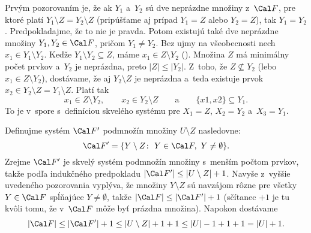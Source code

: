 {Prvým pozorovaním je, že ak $Y_1$ a~$Y_2$ sú dve neprázdne množiny z~$\Cal F$, pre ktoré platí $Y_1\setminus Z = Y_2\setminus Z$ (pripúšťame aj prípad
$Y_1 = Z$ alebo $Y_2 = Z$), tak $Y_1 = Y_2$. Predpokladajme, že to nie je pravda. Potom existujú také dve neprázdne množiny $Y_1,Y_2\in\Cal F$, pričom $Y_1\ne Y_2$. Bez ujmy na všeobecnosti nech $x_1\in Y_1\setminus Y_2$. Keďže $Y_1\setminus Y_2\subseteq Z$, máme $x_1\in Z\setminus Y_2$ (\obr). Množina $Z$ má minimálny počet prvkov a~$Y_2$ je neprázdna, preto $|Z|\le|Y_2|$. Z~toho, že $Z\not\subseteq Y_2$ (lebo $x_1\in Z\setminus Y_2$), dostávame, že aj $Y_2\setminus Z$ je neprázdna a~teda existuje prvok $x_2\in Y_2\setminus Z = Y_1\setminus Z$. Platí tak
$$
x_1 \in Z\setminus Y_2,\qquad x_2\in Y_2\setminus Z\qquad\text{a}\qquad \{x1,x2\}\subseteq Y_1.
$$
To je v~spore s~definíciou skvelého systému pre $X_1 = Z$, $X_2 = Y_2$ a~$X_3 = Y_1$.
%

Definujme systém $\Cal F'$ podmnožín množiny $U\setminus Z$ nasledovne:
$$
\Cal F' = \{Y\setminus Z\colon\ Y\in\Cal F,\ Y\ne\emptyset\}.
$$
Zrejme $\Cal F'$ je skvelý systém podmnožín množiny s~menším počtom prvkov, takže podľa indukčného predpokladu $|\Cal F'|\le|U\setminus Z|+1$. Navyše z~vyššie uvedeného pozorovania vyplýva, že množiny $Y\setminus Z$ sú navzájom rôzne pre všetky $Y\in\Cal F$ spĺňajúce $Y\ne\emptyset$, takže $|\Cal F|\le|\Cal F'|+1$ (sčítanec $+1$ je tu kvôli tomu, že v~$\Cal F$ môže byť prázdna množina). Napokon dostávame
$$
|\Cal F| \le |\Cal F'| + 1 \le |U\setminus Z| + 1 + 1 \le |U| - 1 + 1 + 1 = |U| + 1.
$$
}

